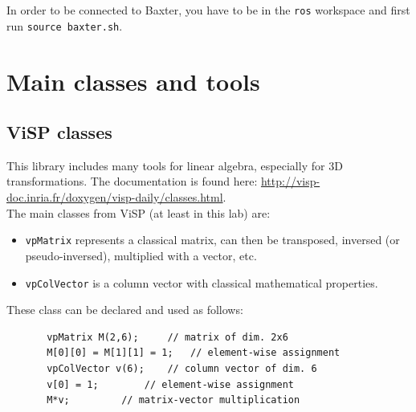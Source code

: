 \documentclass{ecnreport}
\begin{document}
In order to be connected to Baxter, you have to be in the \texttt{ros} workspace and first run \texttt{source baxter.sh}. 

\appendix

\section{Main classes and tools}\label{sec:classes}

\subsection{ViSP classes}

This library includes many tools for linear algebra, especially for 3D transformations. 
The documentation is found here: \url{http://visp-doc.inria.fr/doxygen/visp-daily/classes.html}.\\
The main classes from ViSP (at least in this lab) are:
\begin{itemize}
\item \texttt{vpMatrix} represents a classical matrix, can then be transposed, inversed (or pseudo-inversed), multiplied with a vector, etc.
\item \texttt{vpColVector} is a column vector with classical mathematical properties.
\end{itemize}
These class can be declared and used as follows:
\begin{center}\cppstyle
\begin{lstlisting}
       vpMatrix M(2,6); 	// matrix of dim. 2x6
       M[0][0] = M[1][1] = 1;	// element-wise assignment
       vpColVector v(6);	// column vector of dim. 6
       v[0] = 1;		// element-wise assignment
       M*v;			// matrix-vector multiplication
\end{lstlisting}
\end{center}
%
%
\end{document}
